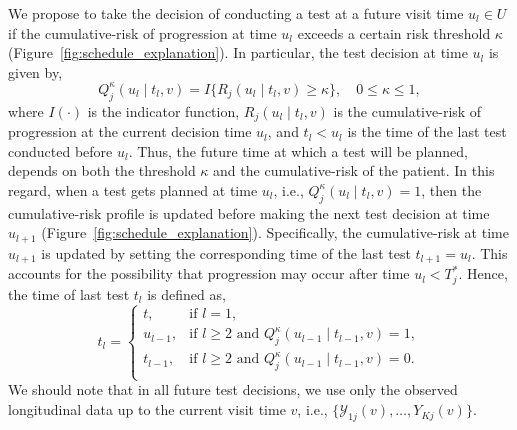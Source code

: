 We propose to take the decision of conducting a test at a future visit time $u_l \in U$ if the cumulative-risk of progression at time $u_l$ exceeds a certain risk threshold $\kappa$ (Figure~\ref{fig:schedule_explanation}). In particular, the test decision at time $u_l$ is given by,
\begin{equation}
\label{eq:personalized_decision_grid}
Q_j^\kappa (u_l \mid t_l, v) = I \big \{ R_j(u_l \mid t_l, v) \geq \kappa \big\}, \quad 0 \leq \kappa \leq 1,
\end{equation}
where $I(\cdot)$ is the indicator function, $R_j(u_l \mid t_l, v)$ is the cumulative-risk of progression at the current decision time $u_l$, and $t_l < u_l$ is the time of the last test conducted before $u_l$. Thus, the future time at which a test will be planned, depends on both the threshold $\kappa$ and the cumulative-risk of the patient. In this regard, when a test gets planned at time $u_l$, i.e., $Q_j^\kappa (u_l \mid t_l, v) = 1$, then the cumulative-risk profile is updated before making the next test decision at time $u_{l+1}$ (Figure~\ref{fig:schedule_explanation}). Specifically, the cumulative-risk at time $u_{l+1}$ is updated by setting the corresponding time of the last test $t_{l+1}=u_l$. This accounts for the possibility that progression may occur after time $u_l < T^*_j$. Hence, the time of last test $t_l$ is defined as,
\begin{equation*}
t_l = \left \{ 
\begin{array}{ll}
t, & \mbox{if } l = 1,\\
u_{l-1}, & \mbox{if } l \geq 2 \mbox{ and } Q_j^\kappa (u_{l-1} \mid t_{l-1}, v) = 1,\\
t_{l-1}, & \mbox{if } l \geq 2 \mbox{ and } Q_j^\kappa (u_{l-1} \mid t_{l-1}, v) = 0.\\
\end{array}
\right.
\end{equation*}
We should note that in all future test decisions, we use only the observed longitudinal data up to the current visit time $v$, i.e., $\{\mathcal Y_{1j}(v), \ldots, Y_{Kj}(v)\}$.
